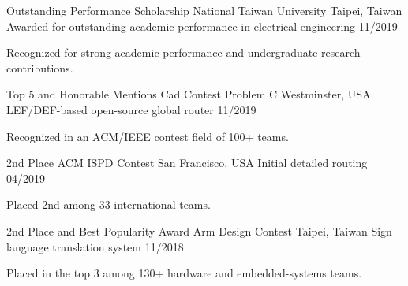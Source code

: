 \vspace{0.8mm}


\begin{cvhonors}

  \cvhonor
    {Outstanding Performance Scholarship}
    {National Taiwan University}
    {Taipei, Taiwan} %
    {Awarded for outstanding academic performance in electrical engineering}
    {11/2019} %
    {
      \vspace{-4.0mm}
      \begin{cvitems}
        \item {Recognized for strong academic performance and undergraduate research contributions.}
      \end{cvitems}
    }

  \cvhonor
    {Top 5 and Honorable Mentions} %
    {Cad Contest Problem C} %
    {Westminster, USA} %
    {LEF/DEF-based open-source global router}
    {11/2019} %
    {
      \vspace{-4.0mm}
      \begin{cvitems}
        \item {Recognized in an ACM/IEEE contest field of 100+ teams.}
      \end{cvitems}
    }

  \cvhonor
    {2nd Place} %
    {ACM ISPD Contest} %
    {San Francisco, USA} %
    {Initial detailed routing}
    {04/2019} %
    {
      \vspace{-4.0mm}
      \begin{cvitems}
        \item {Placed 2nd among 33 international teams.}
      \end{cvitems}
    }

  \cvhonor
    {2nd Place and Best Popularity Award}
    {Arm Design Contest}
    {Taipei, Taiwan}
    {Sign language translation system}
    {11/2018}
    {
      \vspace{-4.0mm}
      \begin{cvitems}
        \item {Placed in the top 3 among 130+ hardware and embedded-systems teams.}
      \end{cvitems}
    }

\end{cvhonors}
